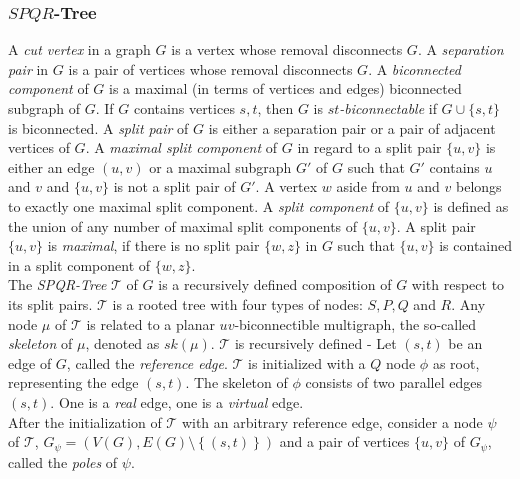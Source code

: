 \subsubsection{$SPQR$-Tree}
A \emph{cut vertex} in a graph $G$ is a vertex whose removal disconnects $G$. A \emph{separation pair} in $G$ is a pair of vertices whose removal disconnects $G$. A \emph{biconnected component} of $G$ is a maximal (in terms of vertices and edges) biconnected subgraph of $G$. If $G$ contains vertices $s,t$, then $G$ is \emph{$st$-biconnectable} if $G \cup \{s,t\}$ is biconnected. A \emph{split pair} of $G$ is either a separation pair or a pair of adjacent vertices of $G$. A \emph{maximal split component} of $G$ in regard to a split pair $\{u,v\}$ is either an edge $(u,v)$ or a maximal subgraph $G'$ of $G$ such that $G'$ contains $u$ and $v$ and $\{u,v\}$ is not a split pair of $G'$. A vertex $w$ aside from $u$ and $v$ belongs to exactly one maximal split component. A \emph{split component} of $\{u,v\}$ is defined as the union of any number of maximal split components of $\{u,v\}$. A split pair $\{u,v\}$ is \emph{maximal}, if there is no split pair $\{w,z\}$ in $G$ such that $\{u,v\}$ is contained in a split component of $\{w,z\}$.\\
The \emph{SPQR-Tree} $\mathcal{T}$ of $G$ is a recursively defined composition of $G$ with respect to its split pairs. $\mathcal{T}$ is a rooted tree with four types of nodes: $S,P,Q$ and $R$. Any node $\mu$ of $\mathcal{T}$ is related to a planar $uv$-biconnectible multigraph, the so-called \emph{skeleton} of $\mu$, denoted as $sk(\mu)$. $\mathcal{T}$ is recursively defined - Let $(s,t)$ be an edge of $G$, called the \emph{reference edge}. $\mathcal{T}$ is initialized with a $Q$ node $\phi$ as root, representing the edge $(s,t)$. The skeleton of $\phi$ consists of two parallel edges $(s,t)$. One is a \emph{real }edge, one is a \emph{virtual }edge.\\
After the initialization of $\mathcal{T}$ with an arbitrary reference edge, consider a node $\psi$ of $\mathcal{T}$, $G_\psi=\left(V(G),E(G)\setminus\left\{(s,t)\right\}\right)$ and a pair of vertices $\{u,v\}$ of $G_\psi$, called the \emph{poles} of $\psi$.

